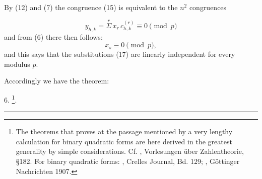 
By (12) and (7) the congruence (15) is equivalent
to the $n^2$ congruences

\[
y_{h,k}=\overset{r}{\Sigma}\,x_{r}\,c_{h,k}^{(r)}\equiv 0\pmod{p} %
\]
and from (6) there then follows:
\[
x_s\equiv 0\pmod{p},
\]
and this says that the substitutions (17) are linearly
independent for every modulus $p$.


Accordingly we have the theorem:

6. \footnote{The theorems that  proves at the passage mentioned by a very
lengthy calculation for binary quadratic forms are here derived in the greatest
generality by simple considerations. Cf. , Vorlesungen \"uber Zahlentheorie, \S 182. For binary quadratic
forms: , Crelles Journal, Bd. 129; , G\"ottinger Nachrichten 1907.}.

\begin{center}\rule{0.2\linewidth}{0.4pt}\end{center}
